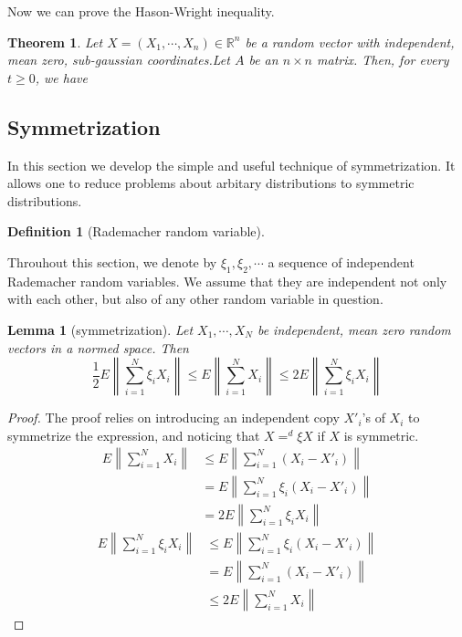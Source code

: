 \documentclass{article}
\newtheorem{Thm}{Theorem}[section]
\newtheorem{Lem}{Lemma}[section]
\theoremstyle{definition}
\newtheorem{Def}{Definition}[section]
\begin{document}
Now we can prove the Hason-Wright inequality.
\begin{Thm}
    Let $X=(X_1,\cdots,X_n)\in \mathbb{R}^n$ be a random vector with independent, 
    mean zero, sub-gaussian coordinates.Let $A$ be an $n\times n$ matrix. Then, for every $t\geq 0$, we have 
    \[ \]
\end{Thm}

\subsection{Symmetrization}
In this section we develop the simple and useful technique of symmetrization.
It allows one to reduce problems about arbitary distributions to symmetric distributions.
\begin{Def}[Rademacher random variable]
    
\end{Def}
Throuhout this section, we denote by $\xi_1,\xi_2,\cdots$ a sequence of independent Rademacher random variables.
We assume that they are independent not only with each other, but also of any other random variable in question.
\begin{Lem}[symmetrization]
    Let $X_1,\cdots,X_N$ be independent, mean zero random vectors in a normed space. Then 
    \[\frac{1}{2}E\left\|\sum_{i=1}^N\xi_iX_i\right\|\le E\left\|\sum_{i=1}^NX_i\right\|\le 2E\left\|\sum_{i=1}^N\xi_iX_i\right\|\]
\end{Lem}
\begin{proof}
    The proof relies on introducing an independent copy $X'_i$'s of $X_i$ to symmetrize the expression,
    and noticing that $X=^d \xi X$ if $X$ is symmetric.
    \begin{align*}
        E\left\|\sum_{i=1}^NX_i\right\|&\le E\left\|\sum_{i=1}^N(X_i-X'_i)\right\|\\
        &=E\left\|\sum_{i=1}^N\xi_i(X_i-X'_i)\right\|\\
        &=2 E\left\|\sum_{i=1}^N\xi_iX_i\right\|
    \end{align*}
    \begin{align*}
        E\left\|\sum_{i=1}^N\xi_iX_i\right\|&\le E\left\|\sum_{i=1}^N\xi_i(X_i-X'_i)\right\|\\
        &=E\left\|\sum_{i=1}^N(X_i-X'_i)\right\|\\
        &\le 2E\left\|\sum_{i=1}^NX_i\right\|
    \end{align*}
        
\end{proof}
\end{document}
